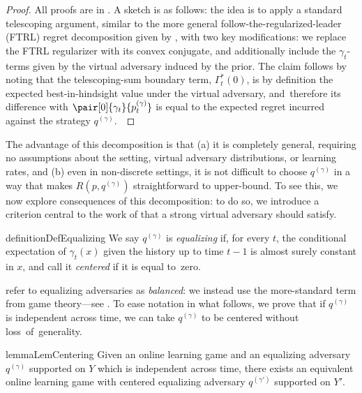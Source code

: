 \documentclass[preprint,12pt]{colt2025}
\begin{document}
\begin{proof}
All proofs are in . 
A sketch is as follows: the idea is to apply a standard telescoping argument, similar to the more general follow-the-regularized-leader (FTRL) regret decomposition given by \textcite[Lemma 7.1]{orabona2019modern}, with two key modifications: we replace the FTRL regularizer with its convex conjugate, and additionally include the $\gamma_t$-terms given by the virtual adversary induced by the prior.
The claim follows by noting that the telescoping-sum boundary term, $\Gamma^*_t(0)$, is by definition the expected best-in-hindsight value under the virtual adversary, and~therefore its difference with $\pair[0]{\gamma_t}{p^{(\gamma)}_t}$ is equal to the expected regret incurred against the strategy $q^{(\gamma)}$.~
\end{proof}

The advantage of this decomposition is that (a) it is completely general, requiring no assumptions about the setting, virtual adversary distributions, or learning rates, and (b) even in non-discrete settings, it is not difficult to choose $q^{(\gamma)}$ in a way that makes $R(p,q^{(\gamma)})$ straightforward to upper-bound.
To see this, we now explore consequences of this decomposition: to do so, we introduce a criterion central to the work of \textcite{gravin2016towards} that a strong virtual adversary should satisfy.

\begin{restatable}{definition}{DefEqualizing}
We say $q^{(\gamma)}$ is \emph{equalizing} if, for every $t$, the conditional expectation of $\gamma_t(x)$ given the history up to time $t-1$ is almost surely constant in $x$, and call it \emph{centered} if it is equal to~zero.
\end{restatable}

\textcite{gravin2016towards} refer to equalizing adversaries as \emph{balanced}: we instead use the more-standard term from game theory---see \textcite[Chapter 11]{straffin2010game}.
To ease notation in what follows, we prove that if $q^{(\gamma)}$ is independent across time, we can take $q^{(\gamma)}$ to be centered without loss~of~generality.

\begin{restatable}{lemma}{LemCentering}
Given an online learning game and an equalizing adversary $q^{(\gamma)}$ supported on $Y$ which is independent across time, there exists an equivalent online learning game with centered equalizing adversary $q^{(\gamma')}$ supported on $Y'$.
\end{restatable}
\end{document}
